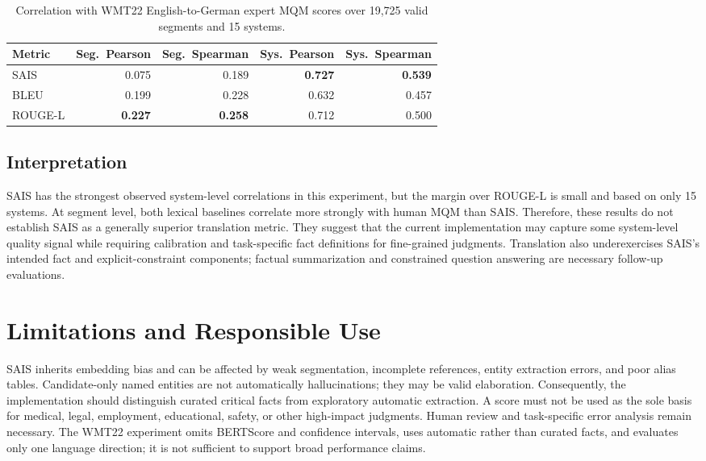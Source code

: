 \documentclass[11pt]{article}
\begin{document}
\begin{table}[t]
\centering
\small
\begin{tabular}{lrrrr}
\toprule
Metric & Seg.\ Pearson & Seg.\ Spearman & Sys.\ Pearson & Sys.\ Spearman \\
\midrule
SAIS & 0.075 & 0.189 & \textbf{0.727} & \textbf{0.539} \\
BLEU & 0.199 & 0.228 & 0.632 & 0.457 \\
ROUGE-L & \textbf{0.227} & \textbf{0.258} & 0.712 & 0.500 \\
\bottomrule
\end{tabular}
\caption{Correlation with WMT22 English-to-German expert MQM scores over
19,725 valid segments and 15 systems.}
\label{tab:results}
\end{table}

\subsection{Interpretation}

SAIS has the strongest observed system-level correlations in this experiment,
but the margin over ROUGE-L is small and based on only 15 systems. At segment
level, both lexical baselines correlate more strongly with human MQM than
SAIS. Therefore, these results do not establish SAIS as a generally superior
translation metric. They suggest that the current implementation may capture
some system-level quality signal while requiring calibration and task-specific
fact definitions for fine-grained judgments. Translation also underexercises
SAIS's intended fact and explicit-constraint components; factual summarization
and constrained question answering are necessary follow-up evaluations.

\section{Limitations and Responsible Use}

SAIS inherits embedding bias and can be affected by weak segmentation,
incomplete references, entity extraction errors, and poor alias tables.
Candidate-only named entities are not automatically hallucinations; they may be
valid elaboration. Consequently, the implementation should distinguish curated
critical facts from exploratory automatic extraction. A score must not be used
as the sole basis for medical, legal, employment, educational, safety, or other
high-impact judgments. Human review and task-specific error analysis remain
necessary. The WMT22 experiment omits BERTScore and confidence intervals, uses
automatic rather than curated facts, and evaluates only one language direction;
it is not sufficient to support broad performance claims.
\end{document}
